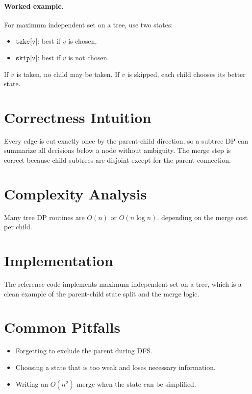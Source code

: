 \paragraph{Worked example.}
For maximum independent set on a tree, use two states:
\begin{itemize}
  \item \(\texttt{take[v]}\): best if \(v\) is chosen,
  \item \(\texttt{skip[v]}\): best if \(v\) is not chosen.
\end{itemize}
If \(v\) is taken, no child may be taken. If \(v\) is skipped, each child chooses its better state.

\section*{Correctness Intuition}

Every edge is cut exactly once by the parent-child direction, so a subtree DP can summarize all decisions below a node
without ambiguity. The merge step is correct because child subtrees are disjoint except for the parent connection.

\section*{Complexity Analysis}

Many tree DP routines are \(O(n)\) or \(O(n \log n)\), depending on the merge cost per child.

\section*{Implementation}

The reference code implements maximum independent set on a tree, which is a clean example of the parent-child state
split and the merge logic.

\section*{Common Pitfalls}

\begin{itemize}
  \item Forgetting to exclude the parent during DFS.
  \item Choosing a state that is too weak and loses necessary information.
  \item Writing an \(O(n^2)\) merge when the state can be simplified.
\end{itemize}

